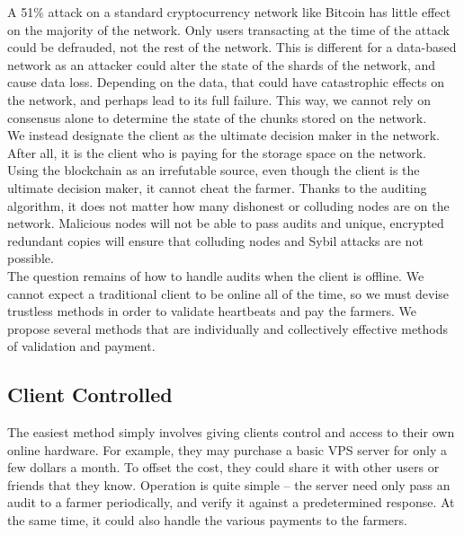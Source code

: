\documentclass[a4paper,10pt]{article}
\begin{document}
A 51\% attack on a standard cryptocurrency network like Bitcoin has little effect on the majority of the network. Only users transacting at the time of the attack could be defrauded, not the rest of the network. This is different for a data-based network as an attacker could alter the state of the shards of the network, and cause data loss. Depending on the data, that could have catastrophic effects on the network, and perhaps lead to its full failure. This way, we cannot rely on consensus alone to determine the state of the chunks stored on the network.  \\

We instead designate the client as the ultimate decision maker in the network. After all, it is the client who is paying for the storage space on the network. Using the blockchain as an irrefutable source, even though the client is the ultimate decision maker, it cannot cheat the farmer. Thanks to the auditing algorithm, it does not matter how many dishonest or colluding nodes are on the network. Malicious nodes will not be able to pass audits and unique, encrypted redundant copies will ensure that colluding nodes and Sybil attacks are not possible. \\

The question remains of how to handle audits when the client is offline. We cannot expect a traditional client to be online all of the time, so we must devise trustless methods in order to validate heartbeats and pay the farmers. We propose several methods that are individually and collectively effective methods of validation and payment.  \\

\subsection{Client Controlled}
The easiest method simply involves giving clients control and access to their own online hardware. For example, they may purchase a basic VPS server for only a few dollars a month. To offset the cost, they could share it with other users or friends that they know. Operation is quite simple -- the server need only pass an audit to a farmer periodically, and verify it against a predetermined response. At the same time, it could also handle the various payments to the farmers. 
\end{document}

